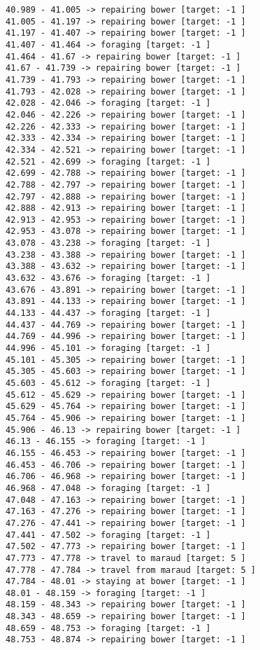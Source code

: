 \documentclass[11pt]{article}
\begin{document}
\begin{Verbatim}[commandchars=\\\{\}]
40.989 - 41.005 -> repairing bower [target: -1 ]
41.005 - 41.197 -> repairing bower [target: -1 ]
41.197 - 41.407 -> repairing bower [target: -1 ]
41.407 - 41.464 -> foraging [target: -1 ]
41.464 - 41.67 -> repairing bower [target: -1 ]
41.67 - 41.739 -> repairing bower [target: -1 ]
41.739 - 41.793 -> repairing bower [target: -1 ]
41.793 - 42.028 -> repairing bower [target: -1 ]
42.028 - 42.046 -> foraging [target: -1 ]
42.046 - 42.226 -> repairing bower [target: -1 ]
42.226 - 42.333 -> repairing bower [target: -1 ]
42.333 - 42.334 -> repairing bower [target: -1 ]
42.334 - 42.521 -> repairing bower [target: -1 ]
42.521 - 42.699 -> foraging [target: -1 ]
42.699 - 42.788 -> repairing bower [target: -1 ]
42.788 - 42.797 -> repairing bower [target: -1 ]
42.797 - 42.888 -> repairing bower [target: -1 ]
42.888 - 42.913 -> repairing bower [target: -1 ]
42.913 - 42.953 -> repairing bower [target: -1 ]
42.953 - 43.078 -> repairing bower [target: -1 ]
43.078 - 43.238 -> foraging [target: -1 ]
43.238 - 43.388 -> repairing bower [target: -1 ]
43.388 - 43.632 -> repairing bower [target: -1 ]
43.632 - 43.676 -> foraging [target: -1 ]
43.676 - 43.891 -> repairing bower [target: -1 ]
43.891 - 44.133 -> repairing bower [target: -1 ]
44.133 - 44.437 -> foraging [target: -1 ]
44.437 - 44.769 -> repairing bower [target: -1 ]
44.769 - 44.996 -> repairing bower [target: -1 ]
44.996 - 45.101 -> foraging [target: -1 ]
45.101 - 45.305 -> repairing bower [target: -1 ]
45.305 - 45.603 -> repairing bower [target: -1 ]
45.603 - 45.612 -> foraging [target: -1 ]
45.612 - 45.629 -> repairing bower [target: -1 ]
45.629 - 45.764 -> repairing bower [target: -1 ]
45.764 - 45.906 -> repairing bower [target: -1 ]
45.906 - 46.13 -> repairing bower [target: -1 ]
46.13 - 46.155 -> foraging [target: -1 ]
46.155 - 46.453 -> repairing bower [target: -1 ]
46.453 - 46.706 -> repairing bower [target: -1 ]
46.706 - 46.968 -> repairing bower [target: -1 ]
46.968 - 47.048 -> foraging [target: -1 ]
47.048 - 47.163 -> repairing bower [target: -1 ]
47.163 - 47.276 -> repairing bower [target: -1 ]
47.276 - 47.441 -> repairing bower [target: -1 ]
47.441 - 47.502 -> foraging [target: -1 ]
47.502 - 47.773 -> repairing bower [target: -1 ]
47.773 - 47.778 -> travel to maraud [target: 5 ]
47.778 - 47.784 -> travel from maraud [target: 5 ]
47.784 - 48.01 -> staying at bower [target: -1 ]
48.01 - 48.159 -> foraging [target: -1 ]
48.159 - 48.343 -> repairing bower [target: -1 ]
48.343 - 48.659 -> repairing bower [target: -1 ]
48.659 - 48.753 -> foraging [target: -1 ]
48.753 - 48.874 -> repairing bower [target: -1 ]

\end{Verbatim}
\end{document}
